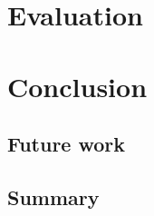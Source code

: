 \documentclass[Report.tex]{subfiles}
\begin{document}
\section{Evaluation}


\section{Conclusion}

\subsection{Future work}

\subsection{Summary}
\end{document}
